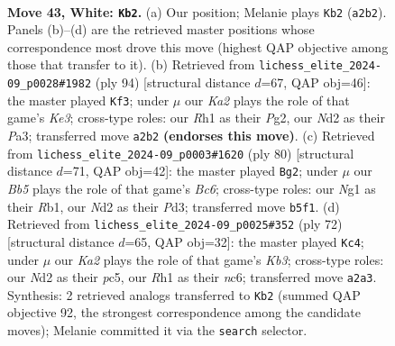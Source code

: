 \documentclass[11pt]{article}
\begin{document}
\clearpage

\begin{figure}[p]\centering
\begin{subfigure}{0.46\textwidth}\centering
\resizebox{\linewidth}{!}{%
\newchessgame
\chessboard[
  setfen={1r6/4r3/1p5k/pBp1n3/P5p1/2P3P1/K1bN3P/4R1NR w - - 7 43},
  showmover=false,
  pgfstyle=straightmove, color=movearrow, markmove={a2-b2}
]}
\caption{}
\end{subfigure}\hfill
\begin{subfigure}{0.46\textwidth}\centering
\resizebox{\linewidth}{!}{%
\newchessgame
\chessboard[
  setfen={2r5/p3r3/1p4pk/1bnB3p/3RP2P/P3K1N1/2R3P1/8 w - - 33 48},
  showmover=false,
  pgfstyle=straightmove, color=movearrow, markmove={e3-f3}
]}
\caption{}
\end{subfigure}
\\[4pt]
\begin{subfigure}{0.46\textwidth}\centering
\resizebox{\linewidth}{!}{%
\newchessgame
\chessboard[
  setfen={1bnr4/4r3/1PB3pk/4pp2/2Np4/3P2P1/7P/1R2R1K1 w - - 3 41},
  showmover=false,
  pgfstyle=straightmove, color=movearrow, markmove={c6-g2}
]}
\caption{}
\end{subfigure}\hfill
\begin{subfigure}{0.46\textwidth}\centering
\resizebox{\linewidth}{!}{%
\newchessgame
\chessboard[
  setfen={3r1k2/6p1/ppnN1p2/2p4p/P6P/1KB3P1/3R1P2/8 w - - 6 37},
  showmover=false,
  pgfstyle=straightmove, color=movearrow, markmove={b3-c4}
]}
\caption{}
\end{subfigure}
\caption{\textbf{Move 43, White: \texttt{Kb2}.} (a) Our position; Melanie plays \texttt{Kb2} (\texttt{a2b2}). Panels (b)--(d) are the retrieved master positions whose correspondence most drove this move (highest QAP objective among those that transfer to it). (b) Retrieved from \texttt{lichess\_elite\_2024-09\_p0028\#1982} (ply 94) [structural distance $d$=67, QAP obj=46]: the master played \texttt{Kf3}; under $\mu$ our \emph{Ka2} plays the role of that game's \emph{Ke3}; cross-type roles: our \emph{R}h1 as their \emph{P}g2, our \emph{N}d2 as their \emph{P}a3; transferred move \texttt{a2b2} \textbf{(endorses this move)}. (c) Retrieved from \texttt{lichess\_elite\_2024-09\_p0003\#1620} (ply 80) [structural distance $d$=71, QAP obj=42]: the master played \texttt{Bg2}; under $\mu$ our \emph{Bb5} plays the role of that game's \emph{Bc6}; cross-type roles: our \emph{N}g1 as their \emph{R}b1, our \emph{N}d2 as their \emph{P}d3; transferred move \texttt{b5f1}. (d) Retrieved from \texttt{lichess\_elite\_2024-09\_p0025\#352} (ply 72) [structural distance $d$=65, QAP obj=32]: the master played \texttt{Kc4}; under $\mu$ our \emph{Ka2} plays the role of that game's \emph{Kb3}; cross-type roles: our \emph{N}d2 as their \emph{p}c5, our \emph{R}h1 as their \emph{n}c6; transferred move \texttt{a2a3}. Synthesis: 2 retrieved analogs transferred to \texttt{Kb2} (summed QAP objective 92, the strongest correspondence among the candidate moves); Melanie committed it via the \texttt{search} selector.}
\label{fig:thought-m84}
\end{figure}
\end{document}
